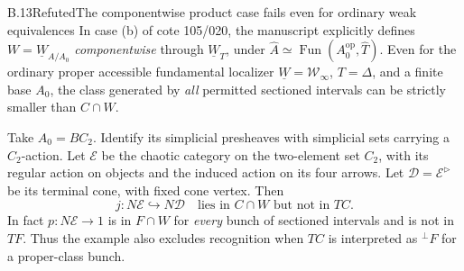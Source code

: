 \begin{claim}{B.13}{Refuted}{The componentwise product case fails even for ordinary weak equivalences}\label{B13}
In case \textup{(b)} of cote 105/020, the manuscript explicitly defines
$W=\underline W_{A/A_0}$ \emph{componentwise} through
$\underline W_T$, under
$\widehat A\simeq\operatorname{Fun}(A_0^{\mathrm{op}},\widehat T)$.
Even for the ordinary proper accessible fundamental localizer
$\underline W=\mathcal W_\infty$, $T=\Delta$, and a finite base $A_0$,
the class generated by \emph{all} permitted sectioned intervals can
be strictly smaller than $C\cap W$.

Take $A_0=BC_2$.  Identify its simplicial presheaves with simplicial
sets carrying a $C_2$-action.  Let $\mathcal E$ be the chaotic category
on the two-element set $C_2$, with its regular action on objects and
the induced action on its four arrows.  Let $\mathcal D=\mathcal
E^{\triangleright}$ be its terminal cone, with fixed cone vertex.
Then
\[
 j:N\mathcal E\hookrightarrow N\mathcal D
 \quad\text{lies in }C\cap W\text{ but not in }TC.
 \tag{B.13.1}
\]
In fact $p:N\mathcal E\to1$ is in $F\cap W$ for \emph{every}
bunch of sectioned intervals and is not in $TF$.  Thus the example
also excludes recognition when $TC$ is interpreted as
${}^{\perp}F$ for a proper-class bunch.
\end{claim}
